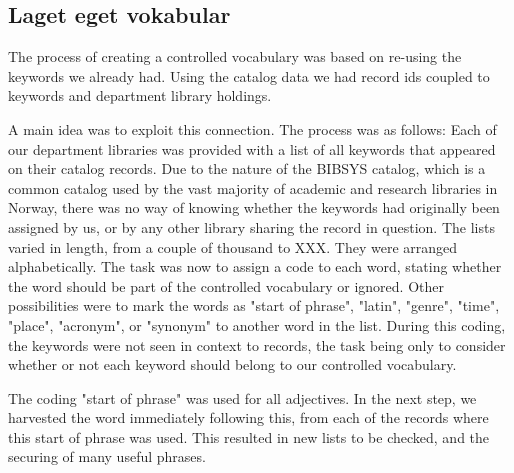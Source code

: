 \subsection{Laget eget vokabular}
The process of creating a controlled vocabulary was based on re-using the keywords we already had. Using the catalog data we had record ids coupled to keywords and department library holdings. 

A main idea was to exploit this connection. The process was as follows: Each of our department libraries was provided with a list of all keywords that appeared on their catalog records. Due to the nature of the BIBSYS catalog, which is a common catalog used by the vast majority of academic and research libraries in Norway, there was no way of knowing whether the keywords had originally been assigned by us, or by any other library sharing the record in question. The lists varied in length, from a couple of thousand to XXX. They were arranged alphabetically. The task was now to assign a code to each word, stating whether the word should be part of the controlled vocabulary or ignored. Other possibilities were to mark the words as "start of phrase", "latin", "genre", "time", "place", "acronym", or "synonym" to another word in the list. During this coding, the keywords were not seen in context to records, the task being only to consider whether or not each keyword should belong to our controlled vocabulary. 

The coding "start of phrase" was used for all adjectives. In the next step, we harvested the word immediately following this, from each of the records where this start of phrase was used. This resulted in new lists to be checked, and the securing of many useful phrases. 